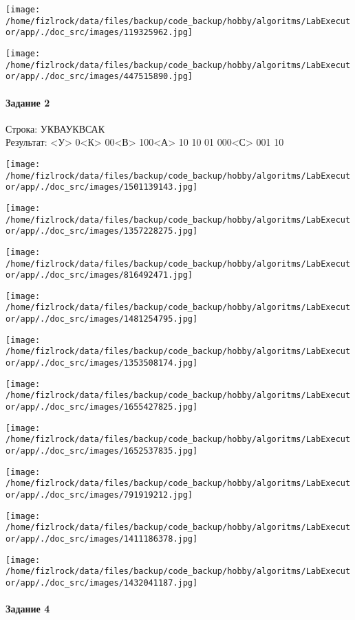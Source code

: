 \documentclass[a4paper, 12pt]{article}
\begin{document}
\texttt{[image: /home/fizlrock/data/files/backup/code\_backup/hobby/algoritms/LabExecutor/app/./doc\_src/images/119325962.jpg]}

\texttt{[image: /home/fizlrock/data/files/backup/code\_backup/hobby/algoritms/LabExecutor/app/./doc\_src/images/447515890.jpg]}
\pagebreak
\paragraph{Задание 2}

Строка: 
УКВАУКВСАК\\
Результат: <У> 0<К> 00<В> 100<А> 10 10 01 000<С> 001 10

\texttt{[image: /home/fizlrock/data/files/backup/code\_backup/hobby/algoritms/LabExecutor/app/./doc\_src/images/1501139143.jpg]}

\texttt{[image: /home/fizlrock/data/files/backup/code\_backup/hobby/algoritms/LabExecutor/app/./doc\_src/images/1357228275.jpg]}

\texttt{[image: /home/fizlrock/data/files/backup/code\_backup/hobby/algoritms/LabExecutor/app/./doc\_src/images/816492471.jpg]}

\texttt{[image: /home/fizlrock/data/files/backup/code\_backup/hobby/algoritms/LabExecutor/app/./doc\_src/images/1481254795.jpg]}

\texttt{[image: /home/fizlrock/data/files/backup/code\_backup/hobby/algoritms/LabExecutor/app/./doc\_src/images/1353508174.jpg]}

\texttt{[image: /home/fizlrock/data/files/backup/code\_backup/hobby/algoritms/LabExecutor/app/./doc\_src/images/1655427825.jpg]}

\texttt{[image: /home/fizlrock/data/files/backup/code\_backup/hobby/algoritms/LabExecutor/app/./doc\_src/images/1652537835.jpg]}

\texttt{[image: /home/fizlrock/data/files/backup/code\_backup/hobby/algoritms/LabExecutor/app/./doc\_src/images/791919212.jpg]}

\texttt{[image: /home/fizlrock/data/files/backup/code\_backup/hobby/algoritms/LabExecutor/app/./doc\_src/images/1411186378.jpg]}

\texttt{[image: /home/fizlrock/data/files/backup/code\_backup/hobby/algoritms/LabExecutor/app/./doc\_src/images/1432041187.jpg]}
\pagebreak
\paragraph{Задание 4}
\end{document}
